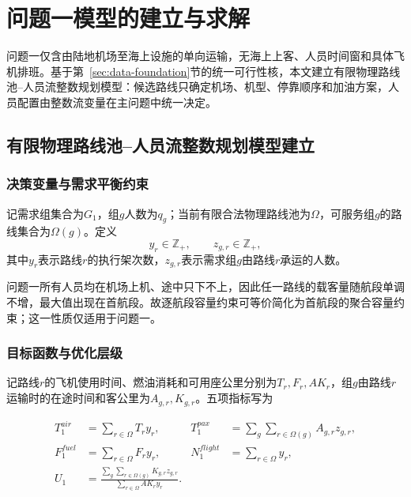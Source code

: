 
\section{问题一模型的建立与求解}\label{sec:q1}

问题一仅含由陆地机场至海上设施的单向运输，无海上上客、人员时间窗和具体飞机排班。基于第~\ref{sec:data-foundation}节的统一可行性核，本文建立有限物理路线池--人员流整数规划模型：候选路线只确定机场、机型、停靠顺序和加油方案，人员配置由整数流变量在主问题中统一决定。

\subsection{有限物理路线池--人员流整数规划模型建立}\label{subsec:q1-model}

\subsubsection{决策变量与需求平衡约束}

记需求组集合为$G_1$，组$g$人数为$q_g$；当前有限合法物理路线池为$\Omega$，可服务组$g$的路线集合为$\Omega(g)$。定义
\[
y_r\in\mathbb Z_+,\qquad
z_{g,r}\in\mathbb Z_+,
\]
其中$y_r$表示路线$r$的执行架次数，$z_{g,r}$表示需求组$g$由路线$r$承运的人数。

问题一所有人员均在机场上机、途中只下不上，因此任一路线的载客量随航段单调不增，最大值出现在首航段。故逐航段容量约束可等价简化为首航段的聚合容量约束；这一性质仅适用于问题一。

\subsubsection{目标函数与优化层级}

记路线$r$的飞机使用时间、燃油消耗和可用座公里分别为$T_r,F_r,AK_r$，组$g$由路线$r$运输时的在途时间和客公里为$A_{g,r},K_{g,r}$。五项指标写为

\[
\begin{aligned}
T_1^{air}&=\sum_{r\in\Omega}T_ry_r, &
T_1^{pax}&=\sum_{g}\sum_{r\in\Omega(g)}A_{g,r}z_{g,r},\\
F_1^{fuel}&=\sum_{r\in\Omega}F_ry_r, &
N_1^{flight}&=\sum_{r\in\Omega}y_r,\\
U_1&=
\frac{\sum_g\sum_{r\in\Omega(g)}K_{g,r}z_{g,r}}
{\sum_{r\in\Omega}AK_ry_r}.
\end{aligned}
\tag{6-1}\label{eq:q1-metrics}
\]


